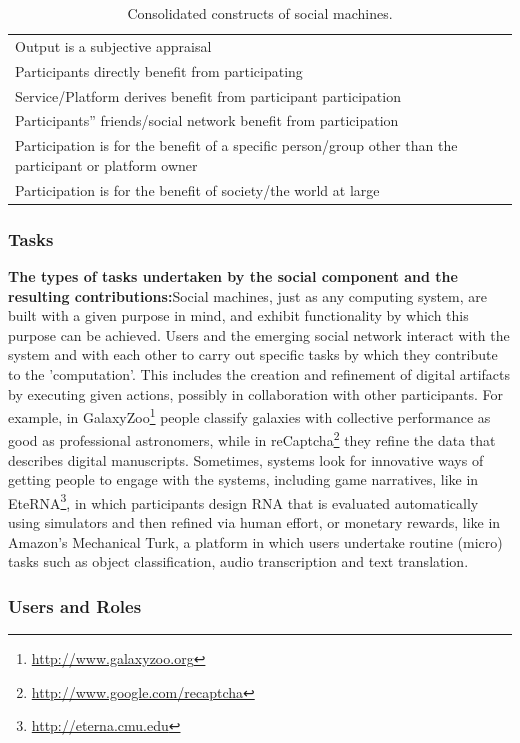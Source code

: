 \documentclass{sig-alternate}
\begin{document}
\begin{table}[htb]
\begin{center}
\begin{tabular}{|p{8cm}|}
Output is a subjective appraisal \\
Participants directly benefit from participating \\
Service/Platform derives benefit from participant participation \\
Participants'' friends/social network benefit from participation \\
Participation is for the benefit of a specific person/group other than the participant or platform owner \\
Participation is for the benefit of society/the world at large  \\
\hline
\end{tabular}
\end{center}
\caption{Consolidated constructs of social machines.} \label{table:constructs}
\end{table}


\subsubsection{Tasks}

{\bf The types of tasks undertaken by the social component and the resulting contributions:}Social machines, just as any computing system, are built with a given purpose in mind, and exhibit functionality by which this purpose can be achieved. Users and the emerging social network interact with the system and with each other to carry out specific tasks by which they contribute to the 'computation'. This includes the creation and refinement of digital artifacts by executing given actions, possibly in collaboration with other participants. For example, in GalaxyZoo\footnote{\url{http://www.galaxyzoo.org}} people classify galaxies with collective performance as good as professional astronomers, while in reCaptcha\footnote{\url{http://www.google.com/recaptcha}} they refine the data that describes digital manuscripts. Sometimes, systems look for innovative ways of getting people to engage with the systems, including game narratives, like in EteRNA\footnote{\url{http://eterna.cmu.edu}}, in which  participants design RNA  that is evaluated automatically using simulators and then refined via human effort, or monetary rewards, like in Amazon's Mechanical Turk, a platform in which users undertake routine (micro) tasks such as object classification, audio transcription and text translation.

\subsubsection{Users and Roles}
\end{document}
